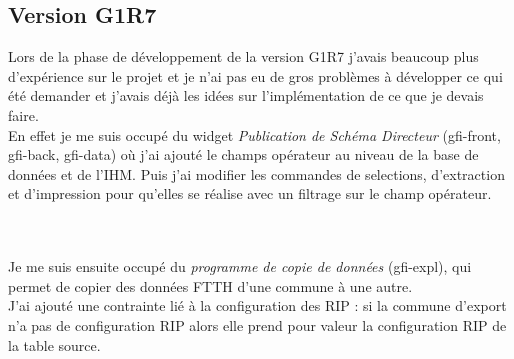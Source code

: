 \subsection{Version G1R7}
Lors de la phase de développement de la version G1R7 j'avais beaucoup plus d'expérience sur le projet et je n'ai pas eu de  gros problèmes à développer ce qui été demander et j'avais déjà les idées sur l'implémentation de ce que je devais faire.
\\En effet je me suis occupé du widget \textit{Publication de Schéma Directeur} (gfi-front, gfi-back, gfi-data) où j'ai ajouté le champs opérateur au niveau de la base de données et de l'IHM. Puis j'ai modifier les commandes de selections, d'extraction et d'impression pour qu'elles se réalise avec un filtrage sur le champ opérateur.
\\\\
\noindent%
\begin{minipage}{\linewidth}%
\label{visina8}%
\end{minipage}\\

Je me suis ensuite occupé du \textit{programme de copie de données} (gfi-expl), qui permet de copier des données FTTH d'une commune à une autre.
\\J'ai ajouté une contrainte lié à la configuration des RIP : si la commune d'export n'a pas de configuration RIP alors elle prend pour valeur la configuration RIP de la table source.

